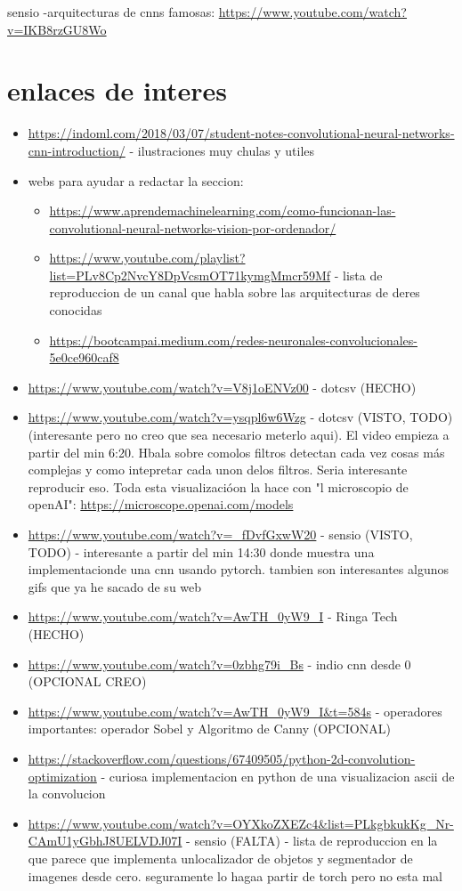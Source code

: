\documentclass{article}
\begin{document}
sensio -arquitecturas de cnns famosas: \url{https://www.youtube.com/watch?v=IKB8rzGU8Wo}

\section{enlaces de interes}
\begin{itemize}
\item \url{https://indoml.com/2018/03/07/student-notes-convolutional-neural-networks-cnn-introduction/} - ilustraciones muy chulas y utiles

\item webs para ayudar a redactar la seccion:
\begin{itemize}
\item \url{https://www.aprendemachinelearning.com/como-funcionan-las-convolutional-neural-networks-vision-por-ordenador/}
\item \url{https://www.youtube.com/playlist?list=PLv8Cp2NvcY8DpVcsmOT71kymgMmcr59Mf} - lista de reproduccion de un canal que habla sobre las arquitecturas de deres conocidas
\item \url{https://bootcampai.medium.com/redes-neuronales-convolucionales-5e0ce960caf8}
\end{itemize}
\item \url{https://www.youtube.com/watch?v=V8j1oENVz00} - dotcsv (HECHO)
\item \url{https://www.youtube.com/watch?v=ysqpl6w6Wzg} - dotcsv (VISTO, TODO) (interesante pero no creo que sea necesario meterlo aqui). El video empieza a partir del min 6:20. Hbala sobre comolos filtros detectan cada vez cosas más complejas y como intepretar cada unon delos filtros. Seria interesante reproducir eso. Toda esta visualizacióon la hace con "l microscopio de openAI": \url{https://microscope.openai.com/models}
\item \url{https://www.youtube.com/watch?v=_fDvfGxwW20} - sensio (VISTO, TODO) - interesante a partir del min 14:30 donde muestra una implementacionde una cnn usando pytorch. tambien son interesantes algunos gifs que ya he sacado de su web
\item \url{https://www.youtube.com/watch?v=AwTH_0yW9_I} - Ringa Tech (HECHO)
\item \url{https://www.youtube.com/watch?v=0zbhg79i_Bs} - indio cnn desde 0 (OPCIONAL CREO)
\item \url{https://www.youtube.com/watch?v=AwTH_0yW9_I&t=584s} - operadores importantes: operador Sobel y Algoritmo de Canny (OPCIONAL)
\item \url{https://stackoverflow.com/questions/67409505/python-2d-convolution-optimization} - curiosa implementacion en python de una visualizacion ascii de la convolucion
\item \url{https://www.youtube.com/watch?v=OYXkoZXEZc4&list=PLkgbkukKg_Nr-CAmU1yGbhJ8UELVDJ07I} - sensio (FALTA) - lista de reproduccion en la que parece que implementa unlocalizador de objetos y segmentador de imagenes desde cero. seguramente lo hagaa partir de torch pero no esta mal
\end{itemize}
\end{document}
